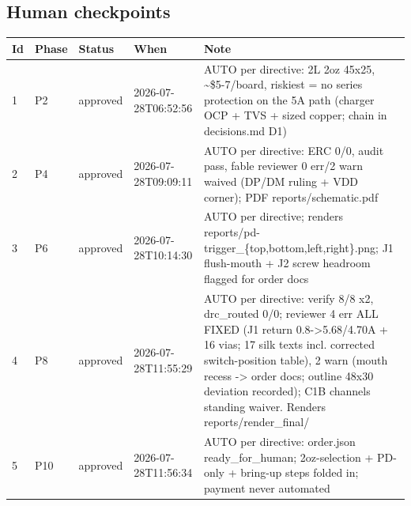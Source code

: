 \documentclass[11pt,a4paper]{article}
\begin{document}
\subsection*{Human checkpoints}
{\small
\begin{longtable}{lllp{2.6cm}p{6.4cm}}
\toprule
\textbf{Id} & \textbf{Phase} & \textbf{Status} & \textbf{When} & \textbf{Note} \\
\midrule
\endhead
1 & P2 & approved & 2026-07-28T06:52:56 & AUTO per directive: 2L 2oz 45x25, \textasciitilde{}\$5-7/board, riskiest = no series protection on the 5A path (charger OCP + TVS + sized copper; chain in decisions.md D1) \\
2 & P4 & approved & 2026-07-28T09:09:11 & AUTO per directive: ERC 0/0, audit pass, fable reviewer 0 err/2 warn waived (DP/DM ruling + VDD corner); PDF reports/schematic.pdf \\
3 & P6 & approved & 2026-07-28T10:14:30 & AUTO per directive; renders reports/pd-trigger\_\{top,bottom,left,right\}.png; J1 flush-mouth + J2 screw headroom flagged for order docs \\
4 & P8 & approved & 2026-07-28T11:55:29 & AUTO per directive: verify 8/8 x2, drc\_routed 0/0; reviewer 4 err ALL FIXED (J1 return 0.8-\textgreater{}5.68/4.70A + 16 vias; 17 silk texts incl. corrected switch-position table), 2 warn (mouth recess -\textgreater{} order docs; outline 48x30 deviation recorded); C1B channels standing waiver. Renders reports/render\_final/ \\
5 & P10 & approved & 2026-07-28T11:56:34 & AUTO per directive: order.json ready\_for\_human; 2oz-selection + PD-only + bring-up steps folded in; payment never automated \\
\bottomrule
\end{longtable}
}
\end{document}
